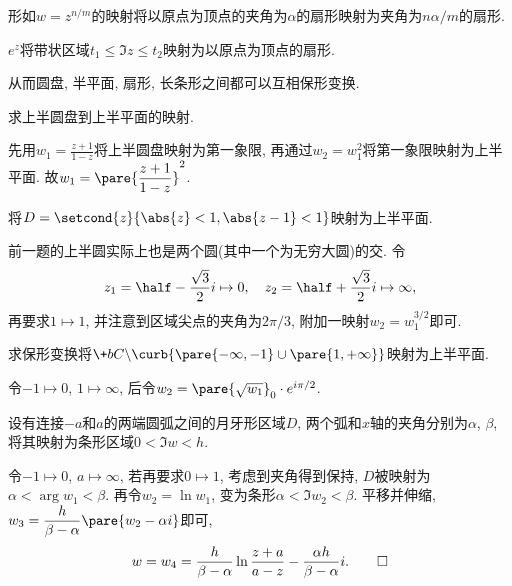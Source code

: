 \documentclass[../ComplexVariable.tex]{subfiles}
\begin{document}
\begin{figure}[ht]
    \centering
    \hspace{1cm}
\end{figure}
\begin{ex}
    形如$w=z^{n/m}$的映射将以原点为顶点的夹角为$\alpha$的扇形映射为夹角为$n\alpha/m$的扇形.
\end{ex}
\begin{ex}
    $e^z$将带状区域$t_1 \le \Im z \le t_2$映射为以原点为顶点的扇形.
\end{ex}
从而圆盘, 半平面, 扇形, 长条形之间都可以互相保形变换.
\begin{sample}
    \begin{ex}
        求上半圆盘到上半平面的映射.
    \end{ex}
    \begin{solution}
        先用$\displaystyle w_1 = \frac{z+1}{1-z}$将上半圆盘映射为第一象限, 再通过$w_2 = w_1^2$将第一象限映射为上半平面. 故$\displaystyle w_1 = \pare{\frac{z+1}{1-z}}^2$.
    \end{solution}
\end{sample}
\begin{sample}
    \begin{ex}
        将$D = \setcond{z}{\abs{z}<1, \abs{z-1}<1}$映射为上半平面.
    \end{ex}
    \begin{solution}
        前一题的上半圆实际上也是两个圆(其中一个为无穷大圆)的交. 令
        \[ z_1 = \half - \frac{\sqrt{3}}{2}i \mapsto 0,\quad z_2 = \half + \frac{\sqrt{3}}{2}i \mapsto \infty, \]
        再要求$1\mapsto 1$, 并注意到区域尖点的夹角为$2\pi/3$, 附加一映射$w_2 = w_1^{3/2}$即可.
    \end{solution}
\end{sample}
\begin{sample}
    \begin{ex}
        求保形变换将$\+bC\backslash\curb{\pare{-\infty,-1} \cup \pare{1,+\infty}}$映射为上半平面.
    \end{ex}
    \begin{solution}
        令$-1\mapsto 0$, $1\mapsto \infty$, 后令$w_2 = \pare{\sqrt{w_1}}_0 \cdot e^{i\pi/2}$.
    \end{solution}
\end{sample}
\begin{sample}
    \begin{ex}
        设有连接$-a$和$a$的两端圆弧之间的月牙形区域$D$, 两个弧和$x$轴的夹角分别为$\alpha$, $\beta$, 将其映射为条形区域$0<\Im w < h$.
    \end{ex}
    \begin{solution}
        令$-1\mapsto 0$, $a\mapsto \infty$, 若再要求$0\mapsto 1$, 考虑到夹角得到保持, $D$被映射为$\alpha < \arg w_1 < \beta$. 再令$w_2 = \ln w_1$, 变为条形$\alpha < \Im w_2 < \beta$. 平移并伸缩, $w_3 = \displaystyle \frac{h}{\beta - \alpha}\pare{w_2 - \alpha i}$即可,
        \[ w=w_4 = \frac{h}{\beta-\alpha} \ln \frac{z+a}{a-z} - \frac{\alpha h}{\beta - \alpha}i. \qedhere \]
    \end{solution}
\end{sample}
\end{document}
